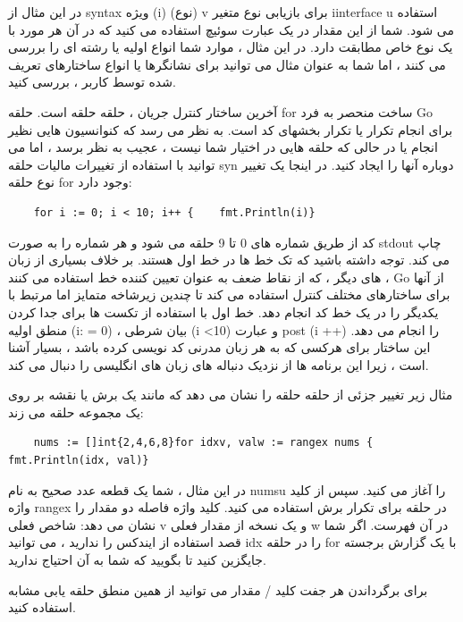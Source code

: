 \documentclass[12pt]{book}
\begin{document}
در این مثال از syntax ویژه (i) (نوع) v برای بازیابی نوع متغیر iinterface u استفاده می شود. شما از این مقدار در یک عبارت سوئیچ استفاده می کنید که در آن هر مورد با یک نوع خاص مطابقت دارد. در این مثال ، موارد شما انواع اولیه یا رشته ای را بررسی می کنند ، اما شما به عنوان مثال می توانید برای نشانگرها یا انواع ساختارهای تعریف شده توسط کاربر ، بررسی کنید.

آخرین ساختار کنترل جریان ، حلقه حلقه است. حلقه for ساخت منحصر به فرد Go برای انجام تکرار یا تکرار بخشهای کد است. به نظر می رسد که کنوانسیون هایی نظیر انجام یا در حالی که حلقه هایی در اختیار شما نیست ، عجیب به نظر برسد ، اما می توانید با استفاده از تغییرات مالیات حلقه syn دوباره آنها را ایجاد کنید. در اینجا یک تغییر نوع حلقه for وجود دارد:
\begin{latin}
	\begin{lstlisting}
	for i := 0; i < 10; i++ {    fmt.Println(i)}
	\end{lstlisting}
\end{latin}

کد از طریق شماره های 0 تا 9 حلقه می شود و هر شماره را به صورت stdout چاپ می کند. توجه داشته باشید که تک خط ها در خط اول هستند. بر خلاف بسیاری از زبان های دیگر ، که از نقاط ضعف به عنوان تعیین کننده خط استفاده می کنند ، Go از آنها برای ساختارهای مختلف کنترل استفاده می کند تا چندین زیرشاخه متمایز اما مرتبط با یکدیگر را در یک خط کد انجام دهد. خط اول با استفاده از تکست ها برای جدا کردن منطق اولیه (i: = 0) ، بیان شرطی (i <10) و عبارت post (i ++) را انجام می دهد. این ساختار برای هرکسی که به هر زبان مدرنی کد نویسی کرده باشد ، بسیار آشنا است ، زیرا این برنامه ها از نزدیک دنباله های زبان های انگلیسی را دنبال می کند.

مثال زیر تغییر جزئی از حلقه حلقه را نشان می دهد که مانند یک برش یا نقشه بر روی یک مجموعه حلقه می زند:
\begin{latin}
	\begin{lstlisting}
	nums := []int{2,4,6,8}for idxv, valw := rangex nums {    fmt.Println(idx, val)}
	\end{lstlisting}
\end{latin}

در این مثال ، شما یک قطعه عدد صحیح به نام numsu را آغاز می کنید. سپس از کلید واژه rangex در حلقه برای تکرار برش استفاده می کنید. کلید واژه فاصله دو مقدار را نشان می دهد: شاخص فعلی v و یک نسخه از مقدار فعلی w در آن فهرست. اگر شما قصد استفاده از ایندکس را ندارید ، می توانید idx را در حلقه for با یک گزارش برجسته جایگزین کنید تا بگویید که شما به آن احتیاج ندارید.

برای برگرداندن هر جفت کلید / مقدار می توانید از همین منطق حلقه یابی مشابه استفاده کنید.
\end{document}
